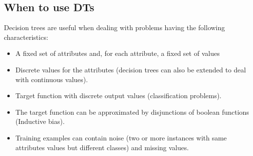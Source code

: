 \subsection{When to use DTs}
Decision trees are useful when dealing with problems having the following characteristics:
\begin{itemize}
    \item A fixed set of attributes and, for each attribute, a fixed set of values
    \item Discrete values for the attributes (decision trees can also be extended to deal with continuous values).
    \item Target function with discrete output values (classification problems).
    \item The target function can be approximated by disjunctions of boolean functions (Inductive bias).
    \item Training examples can contain noise (two or more instances with same attributes values but different classes) and missing values.
    
\end{itemize}
